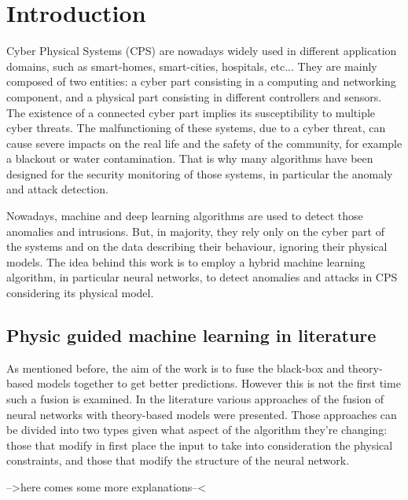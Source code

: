 \chapter{Introduction} \label{chap:intro}

Cyber Physical Systems (CPS) are nowadays widely used in different application domains, such as smart-homes, smart-cities, hospitals, etc... They are mainly composed of two entities: a cyber part consisting in a computing and networking component, and a physical part consisting in different controllers and sensors. The existence of a connected cyber part implies its susceptibility to multiple cyber threats. The malfunctioning of these systems, due to a cyber threat, can cause severe impacts on the real life and the safety of the community, for example a blackout or water contamination. That is why many algorithms have been designed for the security monitoring of those systems, in particular the anomaly and attack detection.

Nowadays, machine and deep learning algorithms are used to detect those anomalies and intrusions. But, in majority, they rely only on the cyber part of the systems and on the data describing their behaviour, ignoring their physical models. The idea behind this work is to employ a hybrid machine learning algorithm, in particular neural networks, to detect anomalies and attacks in CPS considering its physical model.

\section{Physic guided machine learning in literature}

As mentioned before, the aim of the work is to fuse the black-box and theory-based models together to get better predictions. However this is not the first time such a fusion is examined. In the literature various approaches of the fusion of neural networks with theory-based models were presented. Those approaches can be divided into two types given what aspect of the algorithm they're changing: those that modify in first place the input to take into consideration the physical constraints, and those that modify the structure of the neural network.

-->here comes some more explanations--<

